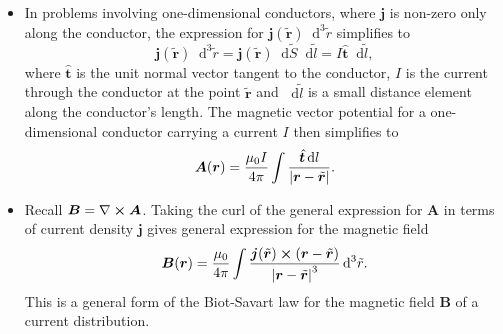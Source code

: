 \documentclass[11pt, a4paper]{article}
\newcommand{\diff}{\mathop{}\!\mathrm{d}} %
\renewcommand{\vec}[1]{\bm{#1}} %
\newcommand{\uvec}[1]{\hat{\vec{#1}}} %
\newcommand{\tvec}[1]{\tilde{\vec{#1}}} %
\renewcommand{\r}{\vec{r}}
\newcommand{\B}{\vec{B}}  %
\newcommand{\A}{\vec{A}}  %
\renewcommand{\curl}{\nabla \cross}
\begin{document}
\begin{itemize}
	\item In problems involving one-dimensional conductors, where $ \vec{j} $ is non-zero only along the conductor, the expression for $ \vec{j}(\tvec{r})\diff^{3}\tilde{r} $ simplifies to
	\begin{equation*}
		\vec{j}(\tvec{r})\diff^{3}\tilde{r} = \vec{j}(\tvec{r}) \diff \tilde{S} \diff \tilde{l} = I \uvec{t} \diff \tilde{l},
	\end{equation*}
	where $ \uvec{t} $ is the unit normal vector tangent to the conductor, $ I $ is the current through the conductor at the point $ \tvec{r} $ and $ \diff \tilde{l} $ is a small distance element along the conductor's length. The magnetic vector potential for a one-dimensional conductor carrying a current $ I $ then simplifies to
	\begin{equation*}
		\A(\r) = \frac{\mu_{0}I}{4\pi} \int \frac{\uvec{t} \diff l}{\abs{\r - \tvec{r}}}.
	\end{equation*}
	
	\item Recall $ \B = \curl \A $. Taking the curl of the general expression for $ \A $ in terms of current density $ \vec{j} $ gives general expression for the magnetic field 
	\begin{equation*}
		\B (\r) = \frac{\mu_{0}}{4\pi}\int \frac{\vec{j}(\tvec{r}) \cross (\r - \tvec{r})}{\abs{\r - \tvec{r}}^{3}} \diff^{3}\tilde{r}.
	\end{equation*}
	This is a general form of the Biot-Savart law for the magnetic field $ \B $ of a current distribution.
	
\end{itemize}
\end{document}
